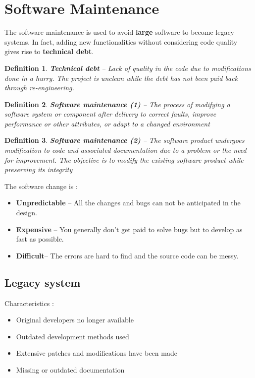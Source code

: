 \documentclass[a4paper,11pt]{report}
\newtheorem{definition}{Definition}
\begin{document}
\section{Software Maintenance}\noindent
	The software maintenance is used
		to avoid \textbf{large} software to become 
		legacy systems. In fact, adding
		new functionalities without 
		considering code quality gives rise
		to \textbf{technical debt}.
	\begin{definition}
		\textbf{Technical debt} -- 
			Lack of quality in the code due to 
			modifications done in a hurry.
			The project is unclean while the debt
			has not been paid back through 
			re-engineering.
	\end{definition}
	\begin{definition}
		\textbf{Software maintenance (1)} -- 
			The process of modifying a software 
			system or component after delivery 
			to correct faults, improve 
			performance or other attributes, 
			or adapt to a changed environment
	\end{definition}
	\begin{definition}
		\textbf{Software maintenance (2)} -- 
			The software product undergoes 
			modification to code and associated 
			documentation due to a problem or
			the need for improvement. 
			The objective is to modify
			the existing software product 
			while preserving its integrity
	\end{definition}\noindent
	The software change is :
	\begin{itemize}
		\setlength{\itemsep}{0pt}		
		\setlength{\parskip}{0pt}		
		\setlength{\parsep}{0pt}	
		\item \textbf{Unpredictable} --
			All the changes and bugs can not be
			anticipated in the design.
		\item \textbf{Expensive} --
			You generally don't get paid to solve bugs but
			to develop as fast as possible.
		\item \textbf{Difficult}-- The errors are hard
			to find and the source code can be messy.
	\end{itemize}
	\subsection{Legacy system}
		Characteristics : 
		\begin{itemize}	
			\item Original developers no longer
				available
			\item Outdated development methods
				used
			\item Extensive patches and modifications 
				have been made
			\item Missing or outdated documentation
		\end{itemize}
\end{document}

